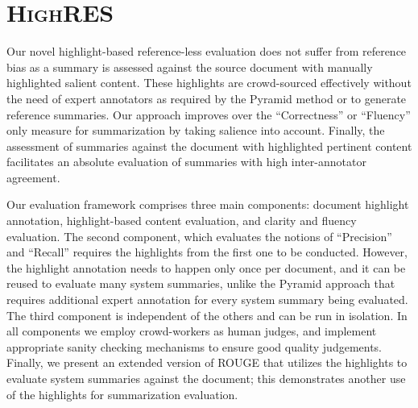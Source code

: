 \documentclass[11pt,a4paper]{article}
\newcommand\highres{\textsc{HighRES}}
\begin{document}

\section{\highres}
\label{sec:highres}


Our novel highlight-based reference-less evaluation does not suffer from reference bias as a summary is assessed against the source document with manually highlighted salient content. These highlights are crowd-sourced effectively without the need of expert annotators as required by the Pyramid method \citep{Nenkova2004a} or to generate reference summaries. Our approach improves over the ``Correctness'' or ``Fluency'' only measure for summarization by taking salience into account. Finally, the assessment of summaries against the document with  highlighted pertinent content facilitates an absolute evaluation of summaries with high inter-annotator agreement. 

Our evaluation framework comprises three main components: document highlight annotation, highlight-based content evaluation, and 
clarity and fluency evaluation. The second component, which evaluates the notions of ``Precision'' and ``Recall'' requires the highlights from the first one to be conducted. However, the highlight annotation needs to happen only once per document, and it can be reused to evaluate many system summaries, unlike the Pyramid approach \citep{Nenkova2004a} that requires additional expert annotation for every system summary being evaluated. The third component is independent of the others and can be run in isolation. In all components we employ crowd-workers as human judges, and implement appropriate sanity checking mechanisms to ensure good quality judgements. Finally, we present an extended version of ROUGE \cite{Lin2004} that utilizes the highlights to evaluate system summaries against the document; this demonstrates another use of the highlights for summarization evaluation. 
\end{document}
